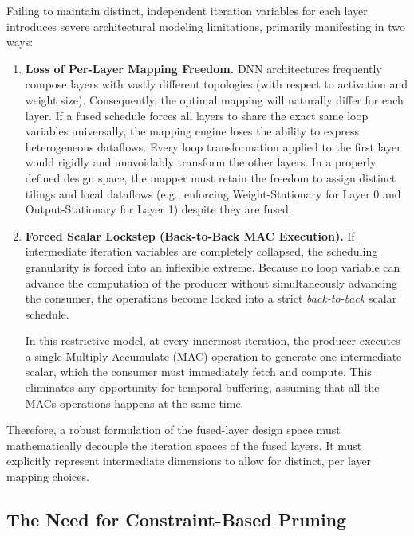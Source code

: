 Failing to maintain distinct, independent iteration variables for each layer introduces severe architectural modeling limitations, primarily manifesting in two ways:

\begin{enumerate}
  \item \textbf{Loss of Per-Layer Mapping Freedom.}
        DNN architectures frequently compose layers with vastly different topologies (with respect to activation and weight size). Consequently, the optimal mapping will naturally differ for each layer. 
        If a fused schedule forces all layers to share the exact same loop variables universally, the mapping engine loses the ability to express heterogeneous dataflows. Every loop transformation applied to the first layer would rigidly and unavoidably transform the other layers. In a properly defined design space, the mapper must retain the freedom to assign distinct tilings and local dataflows (e.g., enforcing Weight-Stationary for Layer 0 and Output-Stationary for Layer 1) despite they are fused. \\

  \item \textbf{Forced Scalar Lockstep (Back-to-Back MAC Execution).}
        If intermediate iteration variables are completely collapsed, the scheduling granularity is forced into an inflexible extreme. Because no loop variable can advance the computation of the producer without simultaneously advancing the consumer, the operations become locked into a strict \emph{back-to-back} scalar schedule. 
        
In this restrictive model, at every innermost iteration, the producer executes a single Multiply-Accumulate (MAC) operation to generate one intermediate scalar, which the consumer must immediately fetch and compute. This eliminates any opportunity for temporal buffering, assuming that all the MACs operations happens at the same time. 
\end{enumerate}

Therefore, a robust formulation of the fused-layer design space must mathematically decouple the iteration spaces of the fused layers. It must explicitly represent intermediate dimensions to allow for distinct, per layer mapping choices.

\subsection{The Need for Constraint-Based Pruning}
\label{sec:fds-pruning}

